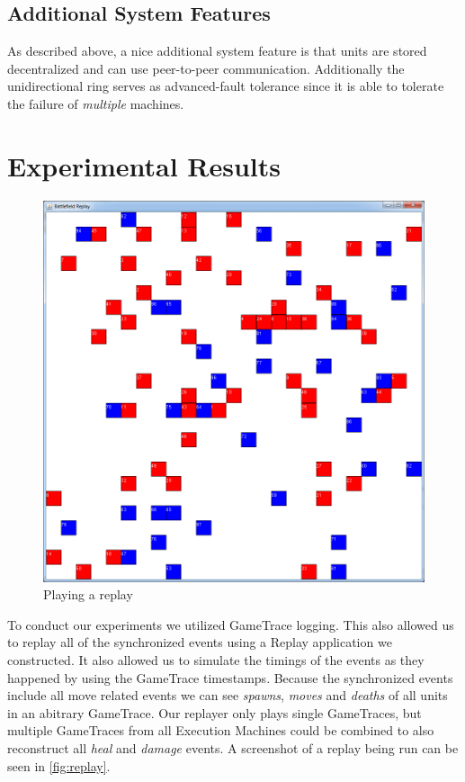 \documentclass[a4paper,10pt]{article}
\begin{document}
\subsection{Additional System Features}
As described above, a nice additional system feature is that units are stored decentralized and can use peer-to-peer communication.
Additionally the unidirectional ring serves as advanced-fault tolerance since it is able to tolerate the failure of \emph{multiple} machines.

\section{Experimental Results}
\label{sec:results}
\begin{figure}
\begin{framed}
    \begin{center}
        \includegraphics[width=\textwidth]{replay.png}    
    \end{center}
    \caption{Playing a replay}
    \label{fig:replay}
\end{framed}
\end{figure}

To conduct our experiments we utilized GameTrace logging.
This also allowed us to replay all of the synchronized events using a Replay application we constructed.
It also allowed us to simulate the timings of the events as they happened by using the GameTrace timestamps.
Because the synchronized events include all move related events we can see \textit{spawns}, \textit{moves} and \textit{deaths} of all units in an abitrary GameTrace.
Our replayer only plays single GameTraces, but multiple GameTraces from all Execution Machines could be combined to also reconstruct all \textit{heal} and \textit{damage} events.
A screenshot of a replay being run can be seen in \autoref{fig:replay}.
\end{document}
